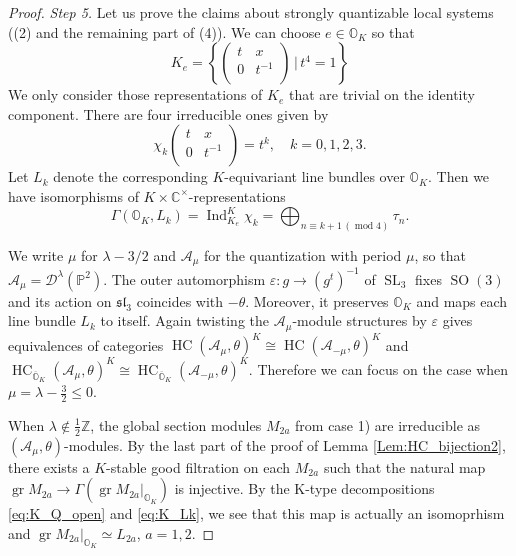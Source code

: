 \documentclass[12pt]{amsart}
\newcommand{\C}{\mathbb{C}}
\newcommand{\A}{\mathcal{A}}
\newcommand{\Orb}{\mathbb{O}}
\newcommand{\Z}{\mathbb{Z}}
\newcommand{\gr}{\operatorname{gr}}
\newcommand{\HC}{\operatorname{HC}}
\newcommand{\SL}{\operatorname{SL}}
\newcommand{\SO}{\operatorname{SO}}
\newcommand{\cm}{\C^\times}
\newcommand{\slf}{\mathfrak{sl}}
\theoremstyle{definition}
\numberwithin{equation}{section}
\begin{document}
\begin{proof}
{\it Step 5.} Let us prove the claims about strongly quantizable local systems ((2) and the remaining part of (4)).
We can choose $e \in \Orb_K$ so that
  \[  K_e = \left\{
     \begin{pmatrix}
  	   t & x\\
  	   0 &t^{-1}\\
      \end{pmatrix}
      \,\Bigg| \, t^4 = 1
  \right\}
  \]
We only consider those representations of $K_e$ that are trivial on the identity component. There are four irreducible ones given by
  \[  \chi_k
    \begin{pmatrix}
  	  t & x\\
  	  0 &t^{-1}\\
    \end{pmatrix}
    = t^k, \quad k = 0,1,2,3. \]
Let $L_k$ denote the corresponding $K$-equivariant line bundles over $\Orb_K$. Then we have isomorphisms of $K \times \cm$-representations
  \begin{equation} \label{eq:K_Lk}
  	 \Gamma(\Orb_K, L_k) = \operatorname{Ind}_{K_e}^K \chi_k = \bigoplus_{n \equiv k+1 \, (\operatorname{mod} 4)} \tau_n.
\end{equation}

We write $\mu$ for $\lambda-3/2$ and $\A_\mu$ for the quantization with period $\mu$, so that
$\A_\mu=\mathscr{D}^{\lambda}(\mathbb{P}^2)$.
The outer automorphism $\varepsilon: g \to (g^t)^{-1}$ of $\SL_3$ fixes $\SO(3)$ and its action on $\slf_3$ coincides with $-\theta$. Moreover, it preserves $\Orb_K$ and maps each line bundle  $L_k$ to itself. Again twisting the $\A_\mu$-module structures by $\varepsilon$ gives equivalences of categories $\HC(\A_\mu,\theta)^K \cong \HC(\A_{-\mu},\theta)^K$ and $\HC_{\overline{\Orb}_K}(\A_\mu,\theta)^K \cong \HC_{\overline{\Orb}_K}(\A_{-\mu},\theta)^K$. Therefore we can focus on the case when $ \mu = \lambda- \frac{3}{2} \leqslant 0$.

When $\lambda \notin \frac{1}{2} \Z$, the global section modules $M_{2a}$ from case 1) are irreducible as $(\A_\mu, \theta)$-modules.  By the last part of the proof of Lemma \ref{Lem:HC_bijection2}, there exists a $K$-stable good filtration on each $M_{2a}$ such that the natural map $\gr M_{2a} \to \Gamma(\gr M_{2a}|_{\Orb_K})$ is injective. By the K-type decompositions \eqref{eq:K_Q_open} and \eqref{eq:K_Lk}, we see that this map is actually an isomoprhism and $\gr M_{2a}|_{\Orb_K} \simeq L_{2a}$, $a = 1,2$. 


\end{proof}
\end{document}
